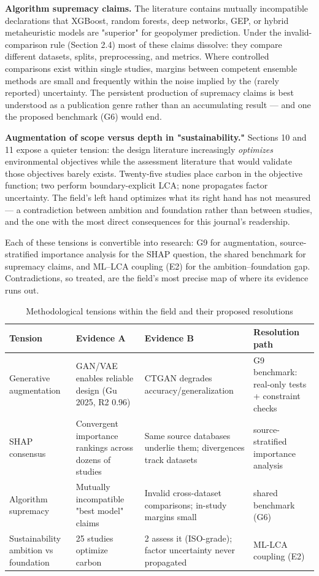 \documentclass[pdflatex,sn-basic]{sn-jnl}
\begin{document}
\textbf{Algorithm supremacy claims.} The literature contains mutually incompatible declarations that XGBoost, random forests, deep networks, GEP, or hybrid metaheuristic models are "superior" for geopolymer prediction. Under the invalid-comparison rule (Section 2.4) most of these claims dissolve: they compare different datasets, splits, preprocessing, and metrics. Where controlled comparisons exist within single studies, margins between competent ensemble methods are small and frequently within the noise implied by the (rarely reported) uncertainty. The persistent production of supremacy claims is best understood as a publication genre rather than an accumulating result --- and one the proposed benchmark (G6) would end.

\textbf{Augmentation of scope versus depth in "sustainability."} Sections 10 and 11 expose a quieter tension: the design literature increasingly \emph{optimizes} environmental objectives while the assessment literature that would validate those objectives barely exists. Twenty-five studies place carbon in the objective function; two perform boundary-explicit LCA; none propagates factor uncertainty. The field's left hand optimizes what its right hand has not measured --- a contradiction between ambition and foundation rather than between studies, and the one with the most direct consequences for this journal's readership.

Each of these tensions is convertible into research: G9 for augmentation, source-stratified importance analysis for the SHAP question, the shared benchmark for supremacy claims, and ML--LCA coupling (E2) for the ambition--foundation gap. Contradictions, so treated, are the field's most precise map of where its evidence runs out.

\begin{table}[htbp]
\caption{Methodological tensions within the field and their proposed resolutions}
\centering
{\footnotesize
\begin{tabular}{p{}p{}p{}p{}}
\toprule
Tension & Evidence A & Evidence B & Resolution path \\
\midrule
Generative augmentation & GAN/VAE enables reliable design (Gu 2025, R2 0.96) & CTGAN degrades accuracy/generalization \citep{liu2025} & G9 benchmark: real-only tests + constraint checks \\
SHAP consensus & Convergent importance rankings across dozens of studies & Same source databases underlie them; divergences track datasets & source-stratified importance analysis \\
Algorithm supremacy & Mutually incompatible "best model" claims & Invalid cross-dataset comparisons; in-study margins small & shared benchmark (G6) \\
Sustainability ambition vs foundation & 25 studies optimize carbon & 2 assess it (ISO-grade); factor uncertainty never propagated & ML-LCA coupling (E2) \\
\bottomrule
\end{tabular}}
\end{table}
\end{document}
